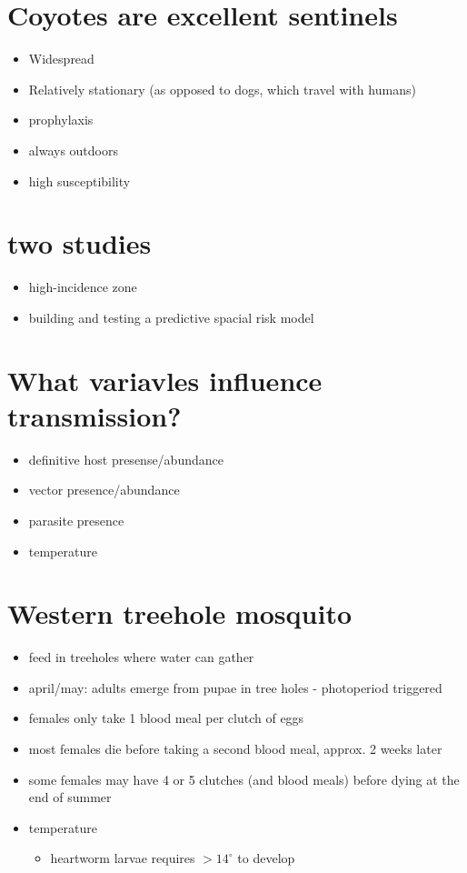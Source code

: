 \documentclass{article}
\begin{document}
    \section{Coyotes are excellent sentinels}
        \begin{itemize}
            \item Widespread
            \item Relatively stationary (as opposed to dogs, which travel with humans)
            \item prophylaxis
            \item always outdoors
            \item high susceptibility
        \end{itemize}

    \section{two studies}
        \begin{itemize}
            \item high-incidence zone
            \item building and testing a predictive spacial risk model
        \end{itemize}

    \section{What variavles influence transmission?}
        \begin{itemize}
            \item definitive host presense/abundance
            \item vector presence/abundance
            \item parasite presence
            \item temperature
        \end{itemize}

    \section{Western treehole mosquito}
        \begin{itemize}
            \item feed in treeholes where water can gather
            \item april/may: adults emerge from pupae in tree holes - photoperiod triggered
            \item females only take 1 blood meal per clutch of eggs
            \item most females die before taking a second blood meal, approx. 2 weeks later
            \item some females may have 4 or 5 clutches (and blood meals) before dying at the end of summer
            \item temperature
            \begin{itemize}
                \item heartworm larvae requires $>14^\circ$ to develop
            \end{itemize}
        \end{itemize}
\end{document}
